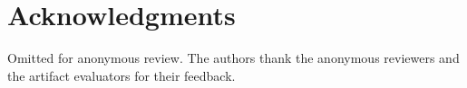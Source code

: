 \section*{Acknowledgments}

Omitted for anonymous review.  The authors thank the anonymous reviewers and
the artifact evaluators for their feedback.

\appendix
